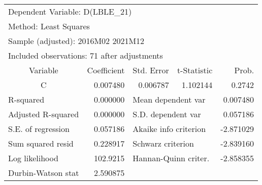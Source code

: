 \begin{tabular}{lrrrr}
\toprule
\multicolumn{3}{l}{Dependent Variable: D(LBLE\_21)}&\multicolumn{1}{c}{}&\multicolumn{1}{c}{}\\
\multicolumn{2}{l}{Method: Least Squares}&\multicolumn{1}{c}{}&\multicolumn{1}{c}{}&\multicolumn{1}{c}{}\\
\multicolumn{3}{l}{Sample (adjusted): 2016M02 2021M12}&\multicolumn{1}{c}{}&\multicolumn{1}{c}{}\\
\multicolumn{4}{l}{Included observations: 71 after adjustments}&\multicolumn{1}{c}{}\\
\midrule
\multicolumn{1}{c}{Variable}&\multicolumn{1}{r}{Coefficient}&\multicolumn{1}{r}{Std. Error}&\multicolumn{1}{r}{t-Statistic}&\multicolumn{1}{r}{Prob.}\\
\midrule
\multicolumn{1}{c}{C}&\multicolumn{1}{r}{0.007480}&\multicolumn{1}{r}{0.006787}&\multicolumn{1}{r}{1.102144}&\multicolumn{1}{r}{0.2742}\\
\midrule
\multicolumn{1}{l}{R-squared}&\multicolumn{1}{r}{0.000000}&\multicolumn{2}{l}{Mean dependent var}&\multicolumn{1}{r}{0.007480}\\
\multicolumn{1}{l}{Adjusted R-squared}&\multicolumn{1}{r}{0.000000}&\multicolumn{2}{l}{S.D. dependent var}&\multicolumn{1}{r}{0.057186}\\
\multicolumn{1}{l}{S.E. of regression}&\multicolumn{1}{r}{0.057186}&\multicolumn{2}{l}{Akaike info criterion}&\multicolumn{1}{r}{-2.871029}\\
\multicolumn{1}{l}{Sum squared resid}&\multicolumn{1}{r}{0.228917}&\multicolumn{2}{l}{Schwarz criterion}&\multicolumn{1}{r}{-2.839160}\\
\multicolumn{1}{l}{Log likelihood}&\multicolumn{1}{r}{102.9215}&\multicolumn{2}{l}{Hannan-Quinn criter.}&\multicolumn{1}{r}{-2.858355}\\
\multicolumn{1}{l}{Durbin-Watson stat}&\multicolumn{1}{r}{2.590875}&\multicolumn{1}{c}{}&\multicolumn{1}{c}{}&\multicolumn{1}{c}{}\\
\bottomrule
\end{tabular}
